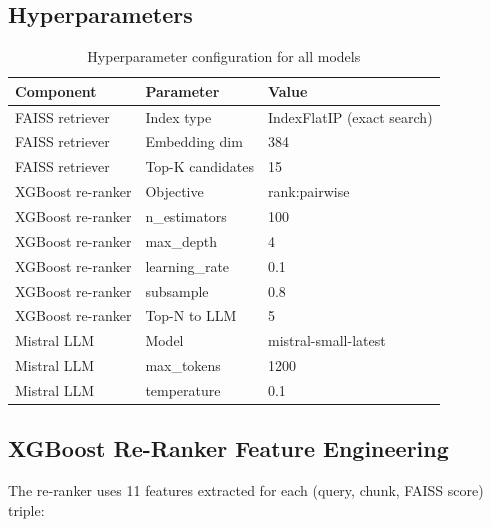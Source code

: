 \documentclass[12pt, letterpaper]{article}
\begin{document}
\subsection{Hyperparameters}

\begin{table}[H]
  \centering
  \caption{Hyperparameter configuration for all models}
  \label{tab:hyperparams}
  \begin{tabular}{lll}
    \toprule
    \textbf{Component} & \textbf{Parameter} & \textbf{Value} \\
    \midrule
    FAISS retriever     & Index type        & IndexFlatIP (exact search) \\
    FAISS retriever     & Embedding dim     & 384 \\
    FAISS retriever     & Top-K candidates  & 15 \\
    XGBoost re-ranker   & Objective         & rank:pairwise \\
    XGBoost re-ranker   & n\_estimators     & 100 \\
    XGBoost re-ranker   & max\_depth        & 4 \\
    XGBoost re-ranker   & learning\_rate    & 0.1 \\
    XGBoost re-ranker   & subsample         & 0.8 \\
    XGBoost re-ranker   & Top-N to LLM      & 5 \\
    Mistral LLM         & Model             & mistral-small-latest \\
    Mistral LLM         & max\_tokens       & 1200 \\
    Mistral LLM         & temperature       & 0.1 \\
    \bottomrule
  \end{tabular}
\end{table}

\subsection{XGBoost Re-Ranker Feature Engineering}

The re-ranker uses 11 features extracted for each (query, chunk, FAISS score) triple:
\end{document}

